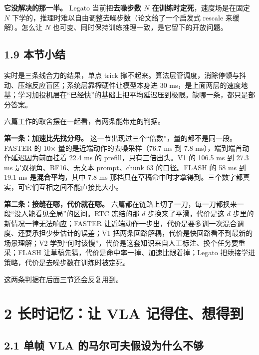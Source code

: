 \documentclass[
  chinese,
]{ctexart}
\begin{document}
\textbf{它没解决的那一半。} Legato 当前把\textbf{去噪步数 \(N\)
在训练时定死}，速度场是在固定 \(N\)
下学的，推理时难以自由调整去噪步数（论文给了一个启发式 rescale
来缓解）。怎么让 \(N\)
也可变、同时保持训练推理一致，是它留下的开放问题。

\subsection{1.9 本节小结}\label{ux672cux8282ux5c0fux7ed3}

实时是三条线合力的结果，单点 trick
撑不起来。算法层管调度，消除停顿与抖动、压缩反应盲区；系统层靠榨硬件让模型本身进
30
ms，是上面两层的速度地基；学习加投机层在``已经快''的基础上把平均延迟压到极限。缺哪一条，都只是部分答案。

六篇工作的取舍摆在一起看，有两条能带走的判据。

\textbf{第一条：加速比先找分母。}
这一节出现过三个``倍数''，量的都不是同一段。FASTER 的 10×
量的是近端动作的去噪采样（76.7 ms 到 7.8
ms），端到端首动作延迟因为前面挂着 22.4 ms 的 prefill，只有三倍出头。V1
的 106.5 ms 到 27.3 ms 是双视角、BF16、无文本 prompt、chunk 63
的口径。FLASH 的 58 ms 到 19.1 ms 是\textbf{混合平均}，其中 7.8 ms
那档只在草稿命中时才拿得到。三个数字都真实，可它们互相之间不能直接比大小。

\textbf{第二条：接缝在哪，代价就在哪。}
六篇都在链路上切了一刀，每一刀都换来一段``没人能看见全局''的区间。RTC
冻结的那 \(d\) 步换来了平滑，代价是这 \(d\)
步里的新情况一律无法响应；FASTER
让近端动作一步出，代价是要多训一次混合调度、还要承担少步估计的误差；V1
把两条回路解耦，代价是快回路看不到最新的场景理解；V2
学到``何时该慢''，代价是这套知识来自人工标注、换个任务要重采；FLASH
让草稿先猜，代价是命中率一掉、加速比跟着掉；Legato
把续接学进策略，代价是去噪步数在训练时被定死。

这两条判据在后面三节还会反复用到。

\section{2 长时记忆：让 VLA
记得住、想得到}\label{ux957fux65f6ux8bb0ux5fc6ux8ba9-vla-ux8bb0ux5f97ux4f4fux60f3ux5f97ux5230}

\subsection{2.1 单帧 VLA
的马尔可夫假设为什么不够}\label{ux5355ux5e27-vla-ux7684ux9a6cux5c14ux53efux592bux5047ux8bbeux4e3aux4ec0ux4e48ux4e0dux591f}
\end{document}
